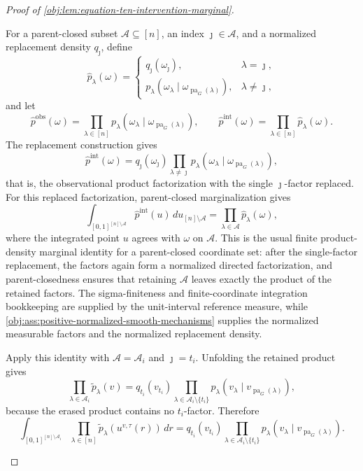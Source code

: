 \documentclass[11pt]{article}
\begin{document}
\begin{proof}[Proof of \cref{obj:lem:equation-ten-intervention-marginal}]
\begin{enumerate}
For a parent-closed subset \(\mathcal A\subseteq[n]\), an index \(\jmath\in\mathcal A\), and a normalized replacement density \(q_{\jmath}\), define
\[
\widehat p_\lambda(\omega)=
\begin{cases}
q_{\jmath}(\omega_{\jmath}), & \lambda=\jmath,\\
p_\lambda\!\left(\omega_\lambda\mid
\omega_{\operatorname{pa}_G(\lambda)}\right), & \lambda\ne\jmath,
\end{cases}
\]
and let
\[
\widehat p^{\mathrm{obs}}(\omega)
=
\prod_{\lambda\in[n]}
p_\lambda\!\left(\omega_\lambda\mid
\omega_{\operatorname{pa}_G(\lambda)}\right),
\qquad
\widehat p^{\mathrm{int}}(\omega)
=
\prod_{\lambda\in[n]}\widehat p_\lambda(\omega).
\]
The replacement construction gives
\[
\widehat p^{\mathrm{int}}(\omega)
=
q_{\jmath}(\omega_{\jmath})
\prod_{\lambda\ne\jmath}
p_\lambda\!\left(\omega_\lambda\mid
\omega_{\operatorname{pa}_G(\lambda)}\right),
\]
that is, the observational product factorization with the single \(\jmath\)-factor replaced. For this replaced factorization, parent-closed marginalization gives
\[
\int_{[0,1]^{[n]\setminus\mathcal A}}
\widehat p^{\mathrm{int}}(u)\,du_{[n]\setminus\mathcal A}
=
\prod_{\lambda\in\mathcal A}\widehat p_\lambda(\omega),
\]
where the integrated point \(u\) agrees with \(\omega\) on \(\mathcal A\). This is the usual finite product-density marginal identity for a parent-closed coordinate set: after the single-factor replacement, the factors again form a normalized directed factorization, and parent-closedness ensures that retaining \(\mathcal A\) leaves exactly the product of the retained factors. The sigma-finiteness and finite-coordinate integration bookkeeping are supplied by the unit-interval reference measure, while \cref{obj:ass:positive-normalized-smooth-mechanisms} supplies the normalized measurable factors and the normalized replacement density.

Apply this identity with \(\mathcal A=\mathcal A_i\) and \(\jmath=t_i\). Unfolding the retained product gives
\[
\prod_{\lambda\in\mathcal A_i}\widetilde p_\lambda(v)
=
q_{t_i}(v_{t_i})
\prod_{\lambda\in\mathcal A_i\setminus\{t_i\}}
p_\lambda\!\left(v_\lambda\mid v_{\operatorname{pa}_G(\lambda)}\right),
\]
because the erased product contains no \(t_i\)-factor. Therefore
\[
\int_{[0,1]^{[n]\setminus\mathcal A_i}}
\prod_{\lambda\in[n]}\widetilde p_\lambda(u^{v,\tau}(r))\,dr
=
q_{t_i}(v_{t_i})
\prod_{\lambda\in\mathcal A_i\setminus\{t_i\}}
p_\lambda\!\left(v_\lambda\mid v_{\operatorname{pa}_G(\lambda)}\right).
\] %


\end{enumerate}
\end{proof}
\end{document}
